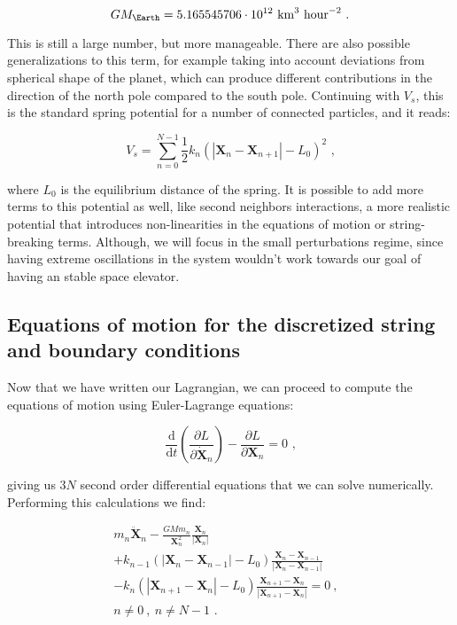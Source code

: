 \documentclass[8 pt, twocolumn]{article}
\newcommand{\der}[2]{\frac{\text{d} #1}{\text{d} #2}}
\newcommand{\prt}[2]{\frac{\partial #1}{\partial #2}}
\renewcommand{\vec}[1]{\pmb{#1}}
\begin{document}
$$ GM_{\Earth} = 5.165545706 \cdot 10^{12} \text{ km}^3 \text{ hour}^{-2} \text{ .} $$

This is still a large number, but more manageable. There are also possible generalizations to this term, for example taking into account deviations from spherical shape of the planet, which can produce different contributions in the direction of the north pole compared to the south pole. Continuing with $V_s$, this is the standard spring potential for a number of connected particles, and it reads:

\begin{equation}
  V_s = \sum_{n=0}^{N-1} \frac{1}{2} k_n (\left|\vec{X}_n - \vec{X}_{n+1}\right| - L_0)^2 \text{ ,}
\end{equation}

where $L_0$ is the equilibrium distance of the spring. It is possible to add more terms to this potential as well, like second neighbors interactions, a more realistic potential that introduces non-linearities in the equations of motion or string-breaking terms. Although, we will focus in the small perturbations regime, since having extreme oscillations in the system wouldn't work towards our goal of having an stable space elevator.

\subsection{Equations of motion for the discretized string and boundary conditions}

Now that we have written our Lagrangian, we can proceed to compute the equations of motion using Euler-Lagrange equations:

\begin{equation}
  \der{}{t} \left( \prt{L}{\vec{\dot X}_n} \right) - \prt{L}{\vec{X}_n} = 0 \text{ ,}
\end{equation}

giving us $3N$ second order differential equations that we can solve numerically. Performing this calculations we find:

\begin{multline}
  m_n \vec{\ddot X}_n - \frac{G M m_n}{\vec{X}^2_n} \frac{\vec{X}_n}{|\vec{X}_n|} \\
  +k_{n-1}(\left|\vec{X}_n - \vec{X}_{n-1}\right| - L_0) \frac{\vec{X}_n- \vec{X}_{n-1}}{\left|\vec{X}_n - \vec{X}_{n-1}\right|} \\
  -k_{n}(\left|\vec{X}_{n+1} - \vec{X}_{n}\right| - L_0) \frac{\vec{X}_{n+1}- \vec{X}_{n}}{\left|\vec{X}_{n+1} - \vec{X}_{n}\right|} = 0 ~,~~~\\
  n\neq0 ~,~ n\neq N-1 \text{ .}
\end{multline}
\end{document}
